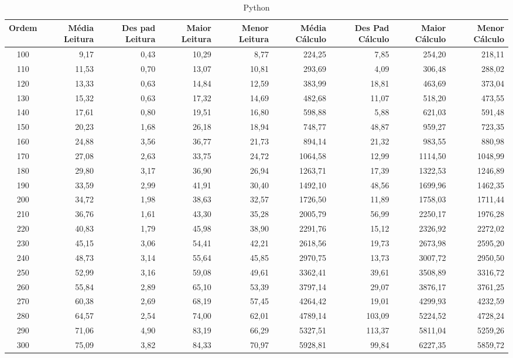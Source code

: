 \begin{landscape}
	\begin{table}[ht]
	\centering
	\begin{tabular}{| c | r | r | r | r | r | r | r | r | }
\hline
Ordem&Média Leitura&Des pad Leitura&Maior Leitura&Menor Leitura&Média Cálculo&Des Pad Cálculo&Maior Cálculo&Menor Cálculo\\ \hline 
		100&9,17&0,43&10,29&8,77&224,25&7,85&254,20&218,11\\
		110&11,53&0,70&13,07&10,81&293,69&4,09&306,48&288,02\\
		120&13,33&0,63&14,84&12,59&383,99&18,81&463,69&373,04\\
		130&15,32&0,63&17,32&14,69&482,68&11,07&518,20&473,55\\
		140&17,61&0,80&19,51&16,80&598,88&5,88&621,03&591,48\\
		150&20,23&1,68&26,18&18,94&748,77&48,87&959,27&723,35\\
		160&24,88&3,56&36,77&21,73&894,14&21,32&983,55&880,98\\
		170&27,08&2,63&33,75&24,72&1064,58&12,99&1114,50&1048,99\\
		180&29,80&3,17&36,90&26,94&1263,71&17,39&1322,53&1246,89\\
		190&33,59&2,99&41,91&30,40&1492,10&48,56&1699,96&1462,35\\
		200&34,72&1,98&38,63&32,57&1726,50&11,89&1758,03&1711,44\\
		210&36,76&1,61&43,30&35,28&2005,79&56,99&2250,17&1976,28\\
		220&40,83&1,79&45,98&38,90&2291,76&15,12&2326,92&2272,02\\
		230&45,15&3,06&54,41&42,21&2618,56&19,73&2673,98&2595,20\\
		240&48,73&3,14&55,64&45,85&2970,75&13,73&3007,72&2950,50\\
		250&52,99&3,16&59,08&49,61&3362,41&39,61&3508,89&3316,72\\
		260&55,84&2,89&65,10&53,39&3797,14&29,07&3876,17&3761,25\\
		270&60,38&2,69&68,19&57,45&4264,42&19,01&4299,93&4232,59\\
		280&64,57&2,54&74,00&62,01&4789,14&103,09&5224,52&4728,24\\
		290&71,06&4,90&83,19&66,29&5327,51&113,37&5811,04&5259,26\\
		300&75,09&3,82&84,33&70,97&5928,81&99,84&6227,35&5859,72\\
\hline
	\end{tabular}
	\caption{Python}
	\label{tabela_python}
	\end{table}
\end{landscape}
